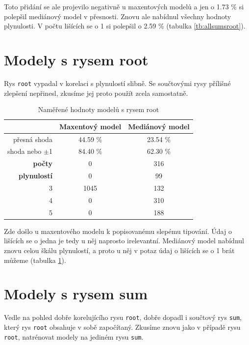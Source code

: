 \documentclass[12pt,a4paper]{report}
\begin{document}
Toto přidání se ale projevilo negativně u maxentových modelů a jen o 1.73 \% si polepšil mediánový model v přesnosti. Znovu ale nabídnul všechny hodnoty plynulosti. V počtu lišících se o 1 si polepšil o 2.59 \% (tabulka \ref{tb:allsumsroot}).


\section{Modely s rysem root}
Rys \texttt{root} vypadal v korelaci s plynulostí slibně. Se součtovými rysy přílišné zlepšení nepřinesl, zkusíme jej proto použít zcela samostatně.

\begin{table}[!htbp]
\begin{center}
\begin{tabular}{|r|c|c|}
\hline
 & \textbf{Maxentový model} & \textbf{Mediánový model} \\
 \hline
  přesná shoda & 44.59 \%  & 23.54 \%  \\
\hline
shoda nebo $\pm$1 & 84.40 \% & 62.30 \%  \\
\hline
     \textbf{počty} \quad 1 & \color{red}0   & \color{OliveGreen}316   \\
\textbf{plynulostí} \quad 2 & \color{red}0 & \color{OliveGreen}99   \\
                          3 & 1045 & \color{OliveGreen}132 \\
                          4 & \color{red}0   & \color{OliveGreen}310 \\
                          5 & \color{red}0   & \color{OliveGreen}188  \\
\hline
\end{tabular}
\caption{Naměřené hodnoty modelů s rysem root}\label{tb:root}
\end{center}
\end{table}

Zde došlo u maxentového modelu k popisovanému slepému tipování. Údaj o lišících se o jedna je tedy u něj naprosto irelevantní. Mediánový model nabídnul znovu celou škálu plynulostí, a proto u něj v potaz údaj o lišících se o 1 brát můžeme (tabulka \ref{tb:root}).

\section{Modely s rysem sum}
Vedle na pohled dobře korelujícího rysu \texttt{root}, dobře dopadl i součtový rys \texttt{sum}, který rys \texttt{root} obsahuje v sobě započítaný. Zkusíme znovu jako v případě rysu \texttt{root}, natrénovat modely na jediném rysu \texttt{sum}.
\end{document}

